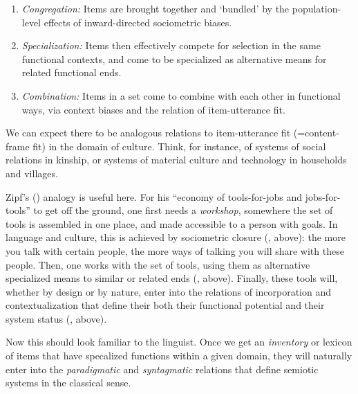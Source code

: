 \begin{enumerate}

\item {\textit{Congregation:} Items are brought together and `bundled' by the population-level effects of inward-directed sociometric biases.}

\item {\textit{Specialization:} Items then effectively compete for selection in the same functional contexts, and come to be specialized as alternative means for related functional ends.}
 \item {\textit{Combination:} Items in a set come to combine with each other in functional ways, via context biases and the relation of item-utterance fit.} 

\end{enumerate}

We can expect there to be analogous relations to 
item-utterance fit  (=content-frame fit) in the domain of culture. Think, for instance, of 
systems of social relations in kinship, or systems of material culture 
and technology in households and villages. 



Zipf's (\citeyear{zipf_human_1949}) analogy is useful here. For his ``economy of tools-for-jobs 
and jobs-for-tools'' to get off the ground, one first needs a \textit{workshop}, somewhere the set of tools is assembled in one place, 
and made accessible to a person with goals. In language and 
culture, this is achieved by sociometric closure (, above): the more you talk with certain people, the more ways of talking you will share with these people. 
Then, one works with the set of tools, using them as alternative specialized means to similar or related ends (, above). Finally, these tools will, whether 
by design or by nature, enter into the relations of incorporation and 
contextualization that define their both their functional potential and their system status (, 
above). 



Now this should look familiar to the linguist. Once we get an \textit{inventory} or lexicon of items that have specalized functions within a given domain, they will naturally enter into the 
\textit{paradigmatic} and \textit{syntagmatic} relations that 
define semiotic systems in the classical sense.









\newpage